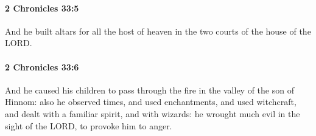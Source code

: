 		\paragraph{2 Chronicles 33:5} %
			\label{2CHRONICLES-33-5}

			And he built altars for all the host of heaven in the two courts of the house of the LORD.


		\paragraph{2 Chronicles 33:6} %
			\label{2CHRONICLES-33-6}

			And he caused his children to pass through the fire in the valley of the son of Hinnom: also he observed times, and used enchantments, and used witchcraft, and dealt with a familiar spirit, and with wizards: he wrought much evil in the sight of the LORD, to provoke him to anger.

